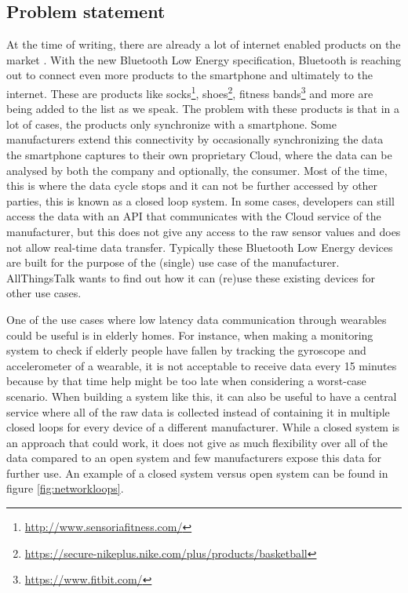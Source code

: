 \documentclass[pdftex,a4paper,12pt,twoside]{report}
\begin{document}
\subsection{Problem statement}
\label{subsec:problemstatement}
At the time of writing, there are already a lot of internet enabled products on the market \citep{gartner2015}. With the new Bluetooth Low Energy specification, Bluetooth is reaching out to connect even more products to the smartphone and ultimately to the internet. These are products like socks\footnote{\url{http://www.sensoriafitness.com/}}, shoes\footnote{\url{https://secure-nikeplus.nike.com/plus/products/basketball}}, fitness bands\footnote{\url{https://www.fitbit.com/}} and more are being added to the list as we speak. The problem with these products is that in a lot of cases, the products only synchronize with a smartphone. Some manufacturers extend this connectivity by occasionally synchronizing the data the smartphone captures to their own proprietary Cloud, where the data can be analysed by both the company and optionally, the consumer. Most of the time, this is where the data cycle stops and it can not be further accessed by other parties, this is known as a closed loop system. In some cases, developers can still access the data with an API that communicates with the Cloud service of the manufacturer, but this does not give any access to the raw sensor values and does not allow real-time data transfer. Typically these Bluetooth Low Energy devices are built for the purpose of the (single) use case of the manufacturer. AllThingsTalk wants to find out how it can (re)use these existing devices for other use cases.

One of the use cases where low latency data communication through wearables could be useful is in elderly homes. For instance, when making a monitoring system to check if elderly people have fallen by tracking the gyroscope and accelerometer of a wearable, it is not acceptable to receive data every 15 minutes because by that time help might be too late when considering a worst-case scenario. When building a system like this, it can also be useful to have a central service where all of the raw data is collected instead of containing it in multiple closed loops for every device of a different manufacturer. While a closed system is an approach that could work, it does not give as much flexibility over all of the data compared to an open system and few manufacturers expose this data for further use. An example of a closed system versus open system can be found in figure \ref{fig:networkloops}.
\end{document}
